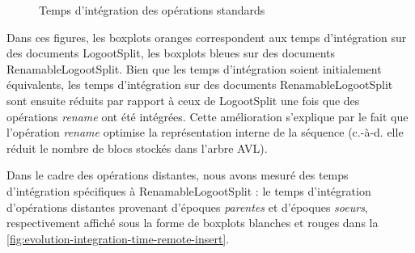 \documentclass[12pt]{thesul}
\newcommand{\ie}{c.-à-d. }
\begin{document}
\begin{figure}[!ht]
  \centering
  \hfil
  \caption{Temps d'intégration des opérations standards}
  \label{fig:evolution-integration-time-insert}
\end{figure}

Dans ces figures, les boxplots oranges correspondent aux temps d'intégration sur des documents LogootSplit, les boxplots bleues sur des documents RenamableLogootSplit.
Bien que les temps d'intégration soient initialement équivalents, les temps d'intégration sur des documents RenamableLogootSplit sont ensuite réduits par rapport à ceux de LogootSplit une fois que des opérations \emph{rename} ont été intégrées.
Cette amélioration s'explique par le fait que l'opération \emph{rename} optimise la représentation interne de la séquence (\ie elle réduit le nombre de blocs stockés dans l'arbre AVL).

Dans le cadre des opérations distantes, nous avons mesuré des temps d'intégration spécifiques à RenamableLogootSplit : le temps d'intégration d'opérations distantes provenant d'époques \emph{parentes} et d'époques \emph{soeurs}, respectivement affiché sous la forme de boxplots blanches et rouges dans la \autoref{fig:evolution-integration-time-remote-insert}.
\end{document}
